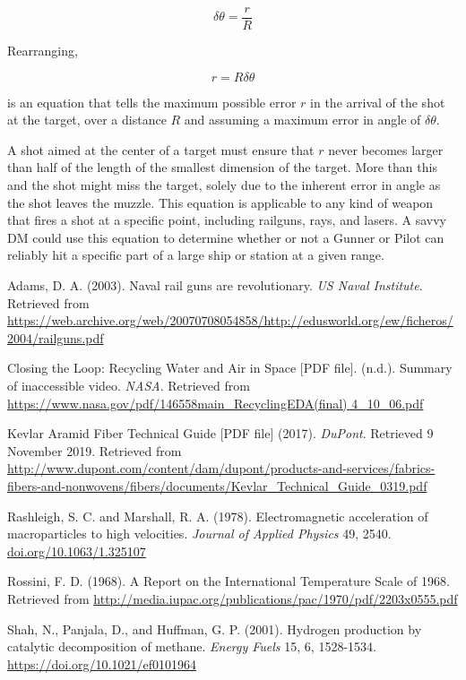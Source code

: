 \documentclass[a4paper]{article}
\begin{document}
\begin{equation} \delta\theta = \frac{r}{R} \end{equation}

Rearranging,

\begin{equation} \label{accuracy}
r = R \delta\theta
\end{equation}

is an equation that tells the maximum possible error $r$ in the arrival of the shot at the target, over a distance $R$ and assuming a maximum error in angle of $\delta\theta$.

A shot aimed at the center of a target must ensure that $r$ never becomes larger than half of the length of the smallest dimension of the target. More than this and the shot might miss the target, solely due to the inherent error in angle as the shot leaves the muzzle. This equation is applicable to any kind of weapon that fires a shot at a specific point, including railguns, rays, and lasers. A savvy DM could use this equation to determine whether or not a Gunner or Pilot can reliably hit a specific part of a large ship or station at a given range. 



\newpage
\begin{thebibliography}{6} %
Adams, D. A. (2003). Naval rail guns are revolutionary. \textit{US Naval Institute}. Retrieved from \url{https://web.archive.org/web/20070708054858/http://edusworld.org/ew/ficheros/2004/railguns.pdf}

Closing the Loop: Recycling Water and Air in Space [PDF file]. (n.d.). Summary of inaccessible video. \textit{NASA}. Retrieved from \url{https://www.nasa.gov/pdf/146558main_RecyclingEDA(final) 4_10_06.pdf}

Kevlar Aramid Fiber Technical Guide [PDF file] (2017). \textit{DuPont}. Retrieved 9 November 2019. Retrieved from \url{http://www.dupont.com/content/dam/dupont/products-and-services/fabrics-fibers-and-nonwovens/fibers/documents/Kevlar_Technical_Guide_0319.pdf}

Rashleigh, S. C. and Marshall, R. A. (1978). Electromagnetic acceleration of macroparticles to high velocities. \textit{Journal of Applied Physics} 49, 2540. \url{doi.org/10.1063/1.325107}	

Rossini, F. D. (1968). A Report on the International Temperature Scale of 1968. Retrieved from \url{http://media.iupac.org/publications/pac/1970/pdf/2203x0555.pdf}

Shah, N., Panjala, D., and Huffman, G. P. (2001). Hydrogen production by catalytic decomposition of methane. \textit{Energy Fuels} 15, 6, 1528-1534. \url{https://doi.org/10.1021/ef0101964}
\end{thebibliography}
\end{document}
